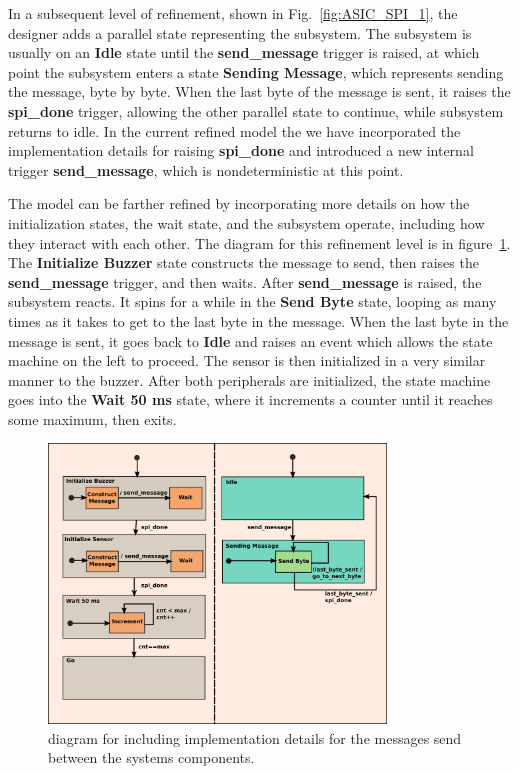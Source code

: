 In a subsequent level of refinement, shown in Fig.~\ref{fig:ASIC_SPI_1}, the designer adds a parallel state representing the \SPI subsystem. The \SPI subsystem is usually on an \textbf{Idle} state until the \textbf{send\_message} trigger is raised, at which point the \SPI subsystem enters a state \textbf{Sending Message}, which represents sending the message, byte by byte. When the last byte of the message is sent, it raises the \textbf{spi\_done} trigger, allowing the other parallel state to continue, while \SPI subsystem returns to idle. In the current refined model the we have incorporated the implementation details for raising \textbf{spi\_done} and introduced a new internal trigger 
\textbf{send\_message}, which is nondeterministic at this point.

The model can be farther refined by incorporating more details on how the initialization states, the wait state, and the \SPI subsystem operate, including how they interact with each other. The \statechart diagram for this refinement level is in figure~\ref{fig:ASIC_SPI_2}. The \textbf{Initialize Buzzer} state constructs the \SPI message to send, then raises the \textbf{send\_message} trigger, and then waits.
After \textbf{send\_message} is raised, the \SPI subsystem reacts. It spins for a while in the \textbf{Send Byte} state, looping as many times as it takes to get to the last byte in the message. When the last byte in the message is sent, it goes back to \textbf{Idle} and raises an event which allows the state machine on the left to proceed. The sensor is then initialized in a very similar manner to the buzzer. After both peripherals are initialized, the state machine goes into the \textbf{Wait 50 ms} state, where it increments a counter until it reaches some maximum, then exits.

\begin{figure}[!htbp]
  \begin{centering}
  \includegraphics[width=0.8\textwidth]{figures/ASIC&SPI_2}
  \caption{\Statechart diagram for \IDS including implementation details for the messages send between the systems components.}
  \label{fig:ASIC_SPI_2}
  \end{centering}
\end{figure} 

